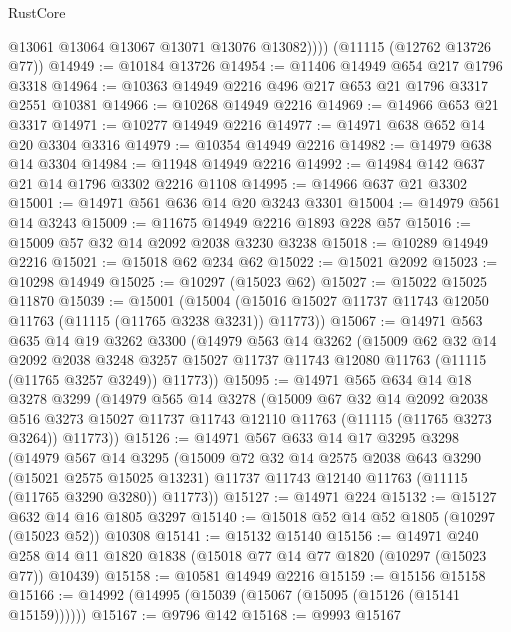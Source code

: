 \begin{lexlean}{RustCore}
\begin{coremodule}
            @13061
            @13064
            @13067
            @13071
            @13076
            @13082))))
    (@11115 (@12762 @13726 @77))
@14949 := @10184 @13726
@14954 := @11406 @14949 @654 @217 @1796 @3318
@14964 := @10363 @14949 @2216 @496 @217 @653 @21 @1796 @3317 @2551 @10381
@14966 := @10268 @14949 @2216
@14969 := @14966 @653 @21 @3317
@14971 := @10277 @14949 @2216
@14977 := @14971 @638 @652 @14 @20 @3304 @3316
@14979 := @10354 @14949 @2216
@14982 := @14979 @638 @14 @3304
@14984 := @11948 @14949 @2216
@14992 := @14984 @142 @637 @21 @14 @1796 @3302 @2216 @1108
@14995 := @14966 @637 @21 @3302
@15001 := @14971 @561 @636 @14 @20 @3243 @3301
@15004 := @14979 @561 @14 @3243
@15009 := @11675 @14949 @2216 @1893 @228 @57
@15016 := @15009 @57 @32 @14 @2092 @2038 @3230 @3238
@15018 := @10289 @14949 @2216
@15021 := @15018 @62 @234 @62
@15022 := @15021 @2092
@15023 := @10298 @14949
@15025 := @10297 (@15023 @62)
@15027 := @15022 @15025 @11870
@15039 := @15001
    (@15004 (@15016 @15027 @11737 @11743 @12050 @11763 (@11115 (@11765 @3238 @3231)) @11773))
@15067 := @14971
    @563
    @635
    @14
    @19
    @3262
    @3300
    (@14979
      @563
      @14
      @3262
      (@15009
        @62
        @32
        @14
        @2092
        @2038
        @3248
        @3257
        @15027
        @11737
        @11743
        @12080
        @11763
        (@11115 (@11765 @3257 @3249))
        @11773))
@15095 := @14971
    @565
    @634
    @14
    @18
    @3278
    @3299
    (@14979
      @565
      @14
      @3278
      (@15009
        @67
        @32
        @14
        @2092
        @2038
        @516
        @3273
        @15027
        @11737
        @11743
        @12110
        @11763
        (@11115 (@11765 @3273 @3264))
        @11773))
@15126 := @14971
    @567
    @633
    @14
    @17
    @3295
    @3298
    (@14979
      @567
      @14
      @3295
      (@15009
        @72
        @32
        @14
        @2575
        @2038
        @643
        @3290
        (@15021 @2575 @15025 @13231)
        @11737
        @11743
        @12140
        @11763
        (@11115 (@11765 @3290 @3280))
        @11773))
@15127 := @14971 @224
@15132 := @15127 @632 @14 @16 @1805 @3297
@15140 := @15018 @52 @14 @52 @1805 (@10297 (@15023 @52)) @10308
@15141 := @15132 @15140
@15156 := @14971
    @240
    @258
    @14
    @11
    @1820
    @1838
    (@15018 @77 @14 @77 @1820 (@10297 (@15023 @77)) @10439)
@15158 := @10581 @14949 @2216
@15159 := @15156 @15158
@15166 := @14992 (@14995 (@15039 (@15067 (@15095 (@15126 (@15141 @15159))))))
@15167 := @9796 @142
@15168 := @9993 @15167

\end{coremodule}
\end{lexlean}
